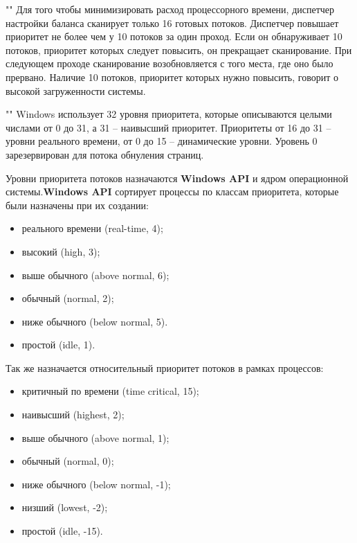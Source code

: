 ""\newline 
\noindent Для того чтобы минимизировать расход процессорного времени, диспетчер настройки баланса сканирует только 16 готовых потоков. Диспетчер повышает приоритет не более чем у 10 потоков за один проход. Если он обнаруживает 10 потоков, приоритет которых следует повысить, он прекращает сканирование. При следующем проходе сканирование возобновляется с того места, где оно было прервано. Наличие 10 потоков, приоритет которых нужно повысить, говорит о высокой загруженности системы.

""\newline 
\noindent Windows использует 32 уровня приоритета, которые описываются целыми числами от 0 до 31, а 31 -- наивысший приоритет. Приоритеты от 16 до 31 -- уровни реального времени, от 0 до 15 -- динамические уровни. Уровень 0 зарезервирован для потока обнуления страниц.

\noindent Уровни приоритета потоков назначаются \textbf{Windows API} и ядром операционной системы.\textbf{Windows API} сортирует процессы по классам приоритета, которые были назначены при их создании:

\begin{itemize}
    \item реального времени (real-time, 4);
    \item высокий (high, 3);
    \item выше обычного (above normal, 6);
    \item обычный (normal, 2);
    \item ниже обычного (below normal, 5).
    \item простой (idle, 1).
\end{itemize}

\noindent Так же назначается относительный приоритет потоков в рамках процессов:

\begin{itemize} 
    \item критичный по времени (time critical, 15);
    \item наивысший (highest, 2);
    \item выше обычного (above normal, 1);
    \item обычный (normal, 0);
    \item ниже обычного (below normal, -1);
    \item низший (lowest, -2);
    \item простой (idle, -15).
\end{itemize} 

